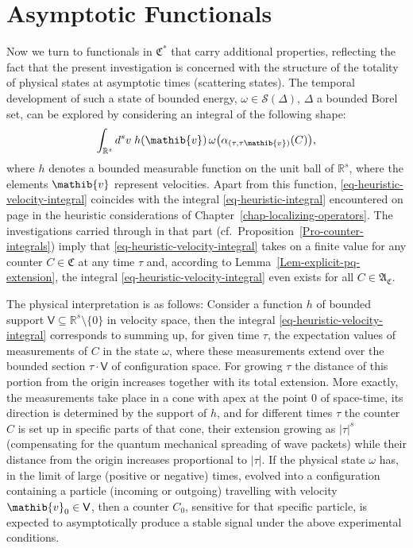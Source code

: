 \documentclass[11pt,twoside,openright]{report}
\theoremstyle{definition}
\theoremstyle{plain}
\theoremstyle{remark}
\theoremstyle{assumption}
\newcommand{\set}[1]{\{ #1 \}}
\newcommand{\abs}[1]{\lvert #1 \rvert}
\newcommand{\Cfrak}{\mathfrak{C}}
\newcommand{\vib}{\mathib{v}}
\newcommand{\Sscr}{\mathscr{S}}
\newcommand{\Vsf}{\mathsf{V}}
\newcommand{\Rs}{\mathbb{R}^s}
\newcommand{\AC}{\mathfrak{A}_\mathfrak{C}}
\newcommand{\Cstar}{\mathfrak{C}^*}
\begin{document}
\section{Asymptotic Functionals}

Now we turn to functionals in $\Cstar$ that carry additional
properties, reflecting the fact that the present investigation is
concerned with the structure of the totality of physical states at
asymptotic times (scattering states). The temporal development of such
a state of bounded energy, $\omega \in \Sscr ( \Delta )$, $\Delta$ a
bounded Borel set, can be explored by considering an integral of the
following shape:
\begin{equation}
  \label{eq-heuristic-velocity-integral}
  \int_{\Rs} d^s v \; h ( \vib ) \, \omega \bigl( \alpha_{( \tau ,
  \tau \vib )} ( C ) \bigr) \text{,}
\end{equation}
where $h$ denotes a bounded measurable function on the unit ball of
$\Rs$, where the elements $\vib$ represent velocities. Apart from this
function, \eqref{eq-heuristic-velocity-integral} coincides with the
integral \eqref{eq-heuristic-integral} encountered on page
\pageref{eq-heuristic-integral} in the heuristic considerations of
Chapter~\ref{chap-localizing-operators}. The investigations carried
through in that part (cf.~Proposition~\ref{Pro-counter-integrals})
imply that \eqref{eq-heuristic-velocity-integral} takes on a finite
value for any counter $C \in \Cfrak$ at any time $\tau$ and, according
to Lemma~\ref{Lem-explicit-pq-extension}, the integral
\eqref{eq-heuristic-velocity-integral} even exists for all $C \in
\AC$.

The physical interpretation is as follows: Consider a function $h$ of
bounded support $\Vsf \subseteq \Rs \setminus \set{0}$ in velocity
space, then the integral \eqref{eq-heuristic-velocity-integral}
corresponds to summing up, for given time $\tau$, the expectation
values of measurements of $C$ in the state $\omega$, where these
measurements extend over the bounded section $\tau \cdot \Vsf$ of
configuration space. For growing $\tau$ the distance of this portion
from the origin increases together with its total extension. More
exactly, the measurements take place in a cone with apex at the point
$0$ of space-time, its direction is determined by the support of $h$,
and for different times $\tau$ the counter $C$ is set up in specific
parts of that cone, their extension growing as $\abs{\tau}^{s}$
(compensating for the quantum mechanical spreading of wave packets)
while their distance from the origin increases proportional to
$\abs{\tau}$. If the physical state $\omega$ has, in the limit of
large (positive or negative) times, evolved into a configuration
containing a particle (incoming or outgoing) travelling with velocity
$\vib_0 \in \Vsf$, then a counter $C_0$, sensitive for that specific
particle, is expected to asymptotically produce a stable signal under
the above experimental conditions.
\end{document}
